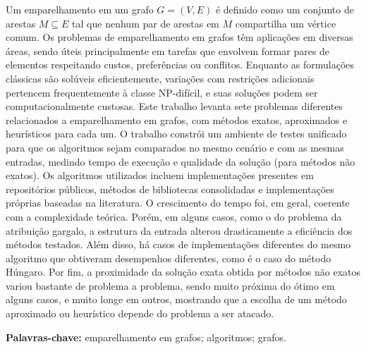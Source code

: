 \begin{resumo}

\noindent Um emparelhamento em um grafo $G=(V,E)$ é definido como um conjunto de arestas $M \subseteq E$ tal que nenhum par de arestas em $M$ compartilha um vértice comum. Os problemas de emparelhamento em grafos têm aplicações em diversas áreas, sendo úteis principalmente em tarefas que envolvem formar pares de elementos respeitando custos, preferências ou conflitos. Enquanto as formulações clássicas são solúveis eficientemente, variações com restrições adicionais pertencem frequentemente à classe NP-difícil, e suas soluções podem ser computacionalmente custosas. Este trabalho levanta sete problemas diferentes relacionados a emparelhamento em grafos, com métodos exatos, aproximados e heurísticos para cada um. O trabalho constrói um ambiente de testes unificado para que os algoritmos sejam comparados no mesmo cenário e com as mesmas entradas, medindo tempo de execução e qualidade da solução (para métodos não exatos). Os algoritmos utilizados incluem implementações presentes em repositórios públicos, métodos de bibliotecas consolidadas e implementações próprias baseadas na literatura. O crescimento do tempo foi, em geral, coerente com a complexidade teórica. Porém, em alguns casos, como o do problema da atribuição gargalo, a estrutura da entrada alterou drasticamente a eficiência dos métodos testados. Além disso, há casos de implementações diferentes do mesmo algoritmo que obtiveram desempenhos diferentes, como é o caso do método Húngaro. Por fim, a proximidade da solução exata obtida por métodos não exatos variou bastante de problema a problema, sendo muito próxima do ótimo em alguns casos, e muito longe em outros, mostrando que a escolha de um método aproximado ou heurístico depende do problema a ser atacado.

\noindent\textbf{Palavras-chave:} emparelhamento em grafos; algoritmos; grafos.
\end{resumo}

